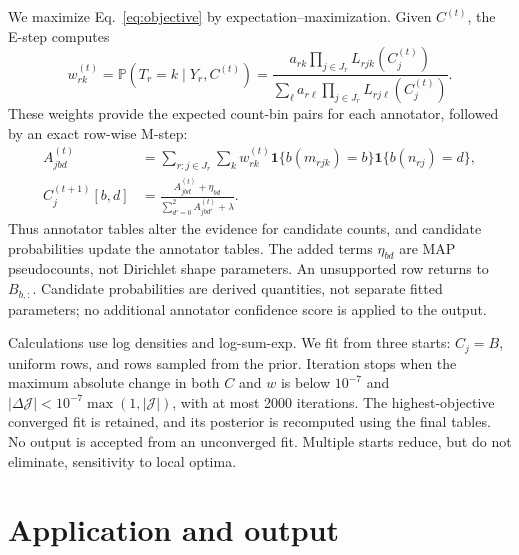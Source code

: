 \documentclass[a4paper,11pt]{article}
\newcommand{\Prob}{\mathbb{P}}
\newcommand{\ind}{\mathbf{1}}
\begin{document}
We maximize Eq.~\eqref{eq:objective} by expectation--maximization.
Given $C^{(t)}$, the E-step computes
\begin{equation}
 w_{rk}^{(t)}=\Prob(T_r=k\mid Y_r,C^{(t)})
 =\frac{a_{rk}\prod_{j\in J_r}L_{rjk}(C_j^{(t)})}
 {\sum_\ell a_{r\ell}\prod_{j\in J_r}L_{rj\ell}(C_j^{(t)})}.
 \label{eq:posterior}
\end{equation}
These weights provide the expected count-bin pairs for each annotator,
followed by an exact row-wise M-step:
\begin{align}
 A_{jbd}^{(t)}&=\sum_{r:j\in J_r}\sum_k w_{rk}^{(t)}
   \ind\{b(m_{rjk})=b\}\ind\{b(n_{rj})=d\},
 \label{eq:expected}\\
 C_j^{(t+1)}[b,d]&=
 \frac{A_{jbd}^{(t)}+\eta_{bd}}
 {\sum_{d'=0}^2 A_{jbd'}^{(t)}+\lambda}.
 \label{eq:update}
\end{align}
Thus annotator tables alter the evidence for candidate counts, and candidate
probabilities update the annotator tables. The added terms $\eta_{bd}$ are MAP
pseudocounts, not Dirichlet shape parameters. An unsupported row returns to
$B_{b,:}$. Candidate probabilities are derived quantities, not separate fitted
parameters; no additional annotator confidence score is applied to the output.

Calculations use log densities and log-sum-exp. We fit from three starts:
$C_j=B$, uniform rows, and rows sampled from the prior. Iteration stops when
the maximum absolute change in both $C$ and $w$ is below $10^{-7}$ and
$|\Delta\mathcal J|<10^{-7}\max(1,|\mathcal J|)$, with at most 2000 iterations.
The highest-objective converged fit is retained, and its posterior is
recomputed using the final tables. No output is accepted from an unconverged
fit. Multiple starts reduce, but do not eliminate, sensitivity to local optima.

\section*{Application and output}
\end{document}
